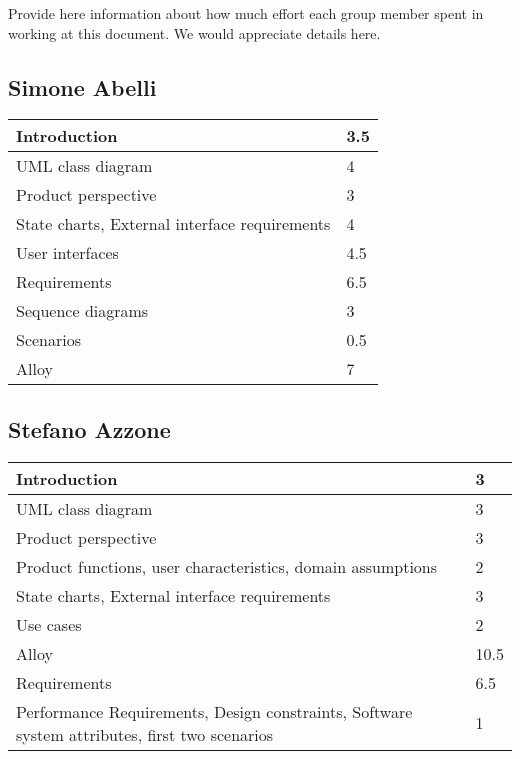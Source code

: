Provide here information about how much effort each group member spent in working at this document. We would appreciate details here.\\

\subsection{Simone Abelli}
\begin{tabular} { | m{5cm} | m{1cm} | }
	\hline
	Introduction & 3.5\\
	\hline
	UML class diagram & 4\\
	\hline
	Product perspective & 3\\
	\hline
	State charts, External interface requirements & 4\\
	\hline
	User interfaces & 4.5\\
	\hline
	Requirements & 6.5\\
	\hline
	Sequence diagrams & 3\\
	\hline
	Scenarios & 0.5\\
	\hline
	Alloy & 7\\
	\hline
\end{tabular}

\subsection{Stefano Azzone}
\begin{tabular} { | m{5cm} | m{1cm} | }
	\hline
	Introduction & 3\\
	\hline
	UML class diagram & 3\\
	\hline
	Product perspective & 3\\
	\hline
	Product functions, user characteristics, domain assumptions & 2\\
	\hline
	State charts, External interface requirements & 3\\
	\hline
	Use cases & 2\\
	\hline
	Alloy & 10.5\\
	\hline
	Requirements & 6.5\\
	\hline
	Performance Requirements, Design constraints, Software system attributes, first two scenarios & 1\\
	\hline
\end{tabular}